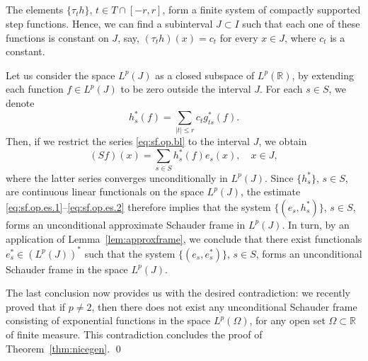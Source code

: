 \documentclass[reqno,a4paper,12pt]{amsart}
\numberwithin{equation}{section}
\numberwithin{figure}{section}
\newcommand\R{\mathbb{R}}
\newcommand\Om{\Omega}
\newcommand\1{\mathds{1}}
\newcommand{\TTT}{T}
\newcommand{\SSS}{S}
\renewcommand\le{\leqslant}
\newcommand\sbt{\subset}
\theoremstyle{plain}
\newcommand{\thmref}[1]{Theorem~\ref{#1}}
\newcommand{\lemref}[1]{Lemma~\ref{#1}}
\theoremstyle{definition}
\begin{document}
\subsection{}
The elements $\{\tau_t h\}$, $t \in \TTT \cap [-r,r]$, form a finite
system of  compactly supported step functions.
Hence, we can find a subinterval $J \sbt I$ such that each
one of these functions is constant on $J$, say,
$(\tau_t h)(x) = c_t$ for every $x \in J$, 
where $c_t$ is a constant.


Let us consider the space $L^p(J)$ as a closed subspace of
$L^p(\R)$, by extending each  function $f \in L^p(J)$ to
be zero outside the interval $J$.
For each $s \in \SSS$, we denote
\begin{equation}
\label{eq:bl.hts.1}
h_{s}^*(f) = \sum_{|t| \le r} c_t g_{ts}^*(f).
\end{equation}
Then, if we restrict the series
\eqref{eq:sf.op.bl} to the interval $J$, we obtain
\begin{equation}
(Sf)(x) = \sum_{s\in \SSS}   h_{s}^*(f) e_s(x), \quad x \in J,
\end{equation}
where the latter series converges unconditionally in $L^p(J)$.
Since $\{h_{s}^*\}$, $s \in \SSS$, are continuous linear functionals
on the space $L^p(J)$, the estimate \eqref{eq:sf.op.es.1}--\eqref{eq:sf.op.es.2}
therefore implies that the system
$\{ (e_s, h_s^*) \}$, $s \in \SSS$, forms
an unconditional approximate Schauder frame in $L^p(J)$.
In turn, by an application of  \lemref{lem:approxframe},
we conclude that there exist functionals $e_s^* \in (L^p(J))^*$ 
such that the system
$\{ (e_s, e_s^*) \}$, $s \in \SSS$, forms
an unconditional Schauder frame in the space $L^p(J)$.


The last conclusion now  provides  us with the desired contradiction: we 
recently proved \cite[Theorem 1.2]{LT25b} that if $p \neq 2$,
then there does not exist 
any unconditional Schauder frame consisting of exponential
functions in the space $L^p(\Om)$, for any open set
$\Om \sbt \R$ of finite measure.
This contradiction concludes the proof of \thmref{thm:nicegen}.
\qed




\end{document}
